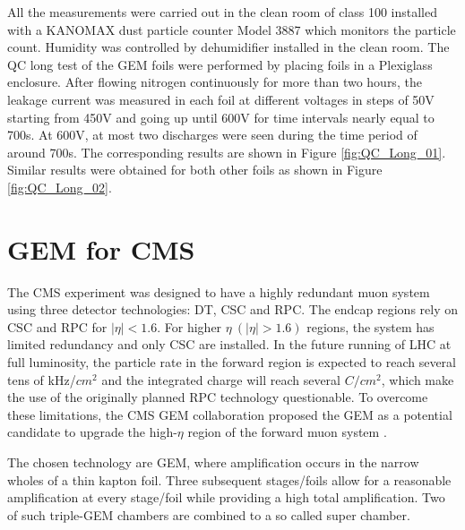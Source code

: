 All the measurements were carried out in the clean room of class 100 installed with a KANOMAX dust particle counter Model 3887 \cite{fourteen} which monitors the particle count. Humidity was controlled by dehumidifier installed in the clean room.
The QC long test of the GEM foils were performed by placing foils in a Plexiglass enclosure. After flowing nitrogen continuously for more than two hours, the leakage current was measured in each foil at different voltages in steps of 50V starting from 450V and going up until 600V for time intervals nearly equal to 700s.
At 600V, at most two discharges were seen during the time period of around 700s. The corresponding results are shown in Figure \ref{fig:QC_Long_01}. Similar results were obtained for both other foils as shown in Figure \ref{fig:QC_Long_02}.


\section{GEM for CMS}
The CMS experiment was designed to have a highly redundant muon system using three detector technologies: DT, CSC and RPC. The endcap regions rely on CSC and RPC for $|\eta|<1.6$. For higher $\eta~ (|\eta|>1.6)$ regions, the system has limited redundancy and only CSC are installed. In the future running of LHC at full luminosity, the particle rate in the forward region is expected to reach several tens of kHz/$cm^2$ and the integrated charge will reach several $C/cm^2$, which make the use of the originally planned RPC technology questionable. To overcome these limitations, the CMS GEM collaboration proposed the GEM as a potential candidate to upgrade the high-$\eta$ region of the forward muon system \cite{Colaleo:2021453}. 

The chosen technology are GEM, where amplification occurs in the narrow wholes of a thin kapton foil. Three subsequent stages/foils allow for a reasonable amplification at every stage/foil while providing a high total amplification. Two of such triple-GEM chambers are combined to a so called super chamber.

